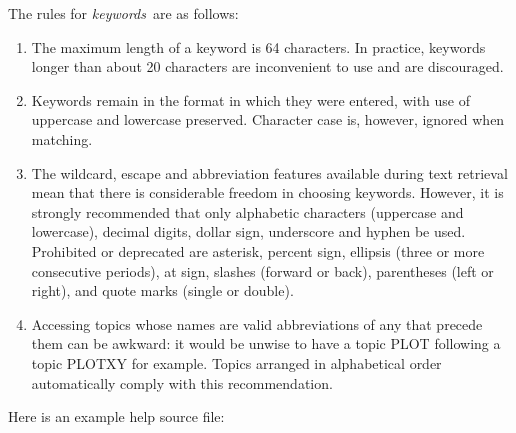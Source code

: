 \documentclass[11pt,nolof]{starlink}
\begin{document}
The rules for \textit{keywords}\, are as follows:
\begin{enumerate}
\item The maximum length of a keyword is 64 characters.  In practice,
keywords longer than about 20 characters are inconvenient to use
and are discouraged.
\item Keywords remain in the format in which they were entered, with
use of uppercase and lowercase preserved.  Character case is, however,
ignored when matching.
\item The wildcard, escape and abbreviation features available during
text retrieval mean that there is considerable freedom in choosing
keywords.  However, it is strongly recommended that only alphabetic
characters (uppercase and lowercase), decimal digits, dollar sign,
underscore and hyphen be used.  Prohibited or deprecated are
asterisk, percent sign, ellipsis (three or more consecutive periods), at
sign, slashes (forward or back), parentheses (left or right), and quote
marks (single or double).
\item Accessing topics whose names are valid abbreviations
of any that precede them can be awkward: it would be
unwise to have a topic PLOT following a topic PLOTXY for example.
Topics arranged in alphabetical order automatically comply with
this recommendation.
\end{enumerate}

Here is an example help source file:
\end{document}
